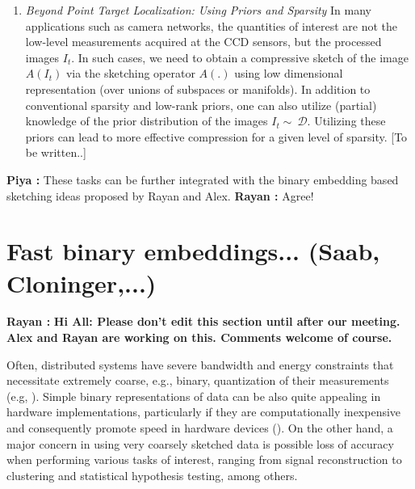 \documentclass{article}
\newcommand{\comment}[3]{{\color{#1} {\bf #2 :} #3}}
\newcommand{\yoav}[1]{\comment{magenta}{Yoav}{#1}}
\newcommand{\piya}[1]{\comment{blue}{Piya}{#1}}
\newcommand{\rayan}[1]{\comment{red}{Rayan}{#1}}
\begin{document}
\begin{itemize}
\begin{enumerate}
\item {\em Beyond Point Target Localization: Using Priors and Sparsity} In many applications such as camera networks, the quantities of interest are not the low-level measurements acquired at the CCD sensors, but the processed images $I_t$. In such cases, we need to obtain a compressive sketch of the image $A (I_t)$ via the sketching operator $A (.)$ using low dimensional representation (over unions of subspaces or manifolds). In addition to conventional sparsity and low-rank priors, one can also utilize (partial) knowledge of the prior distribution of the images $I_t\sim~\mathcal{D}$. Utilizing these priors can lead to more effective compression for a given level of sparsity. {\color{red} [To be written..]}  
\end{enumerate}
\piya{These tasks can be further integrated with the binary embedding based sketching ideas proposed by Rayan and Alex.}
\rayan{Agree!}
\end{itemize}

\section{Fast binary embeddings... (Saab, Cloninger,...)}
\rayan{{\bf Hi All: Please don't edit this section until after our meeting. Alex and Rayan are working on this. Comments welcome of course.}}


Often, distributed systems have severe bandwidth and energy constraints that necessitate extremely
coarse, e.g., binary, quantization of their measurements (e.g, \cite{fang2014sparse,boufounos20081}). Simple binary representations of data can be also quite appealing in hardware implementations, particularly if they are computationally inexpensive and consequently promote speed in hardware devices (\cite{jacques2013robust,le2005analog}). On the other hand, a major concern in using very coarsely sketched data is possible loss of accuracy when performing various tasks of interest, ranging from signal reconstruction to clustering and statistical hypothesis testing, among others.
\end{document}
